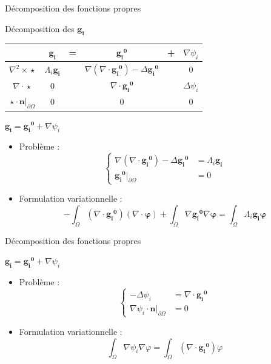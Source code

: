 \documentclass{beamer}
\newcommand{\grad}{{\nabla}}
\newcommand{\laplace}{{\Delta}}
\newcommand{\rott}{{\nabla^2\times}}
\renewcommand{\div}{{\nabla\cdot}}
\newcommand{\restr}{{\big\rvert_{\partial\Omega}}}
\begin{document}
\begin{frame}{Décomposition des fonctions propres}
\begin{block}{Décomposition des $\mathbf{g_i}$}
\begin{center}
\begin{tabular}{c|ccccc}
& $\mathbf{g_i}$ & = & $\mathbf{\mathbf{g_i}^0}$ & + & $\grad\psi_i$ \\ \hline
$\rott\star$ & $\Lambda_i \mathbf{g_i}$ & & $\grad(\div \mathbf{\mathbf{g_i}^0})-\laplace \mathbf{\mathbf{g_i}^0}$ & & 0\\ \hline
$\div\star$ & 0 & & $\div \mathbf{\mathbf{g_i}^0}$ & & $\laplace\psi_i$\\ \hline
$\star\cdot \mathbf{n}\restr$ & 0 & & 0 & & 0
\end{tabular}
\end{center}
\end{block}
\begin{block}{$\mathbf{g_i}=\mathbf{\mathbf{g_i}^0}+\grad\psi_i$}
\begin{itemize}
\item Problème :
\[\left\{\begin{aligned}
\grad(\div \mathbf{\mathbf{g_i}^0})-\laplace \mathbf{\mathbf{g_i}^0} &= \Lambda_i \mathbf{g_i}\\
\mathbf{\mathbf{g_i}^0}\restr &= 0
\end{aligned}\right.\]
\item Formulation variationnelle :
\[ -\int_\Omega (\div \mathbf{\mathbf{g_i}^0})(\div\bm{\varphi}) + \int_\Omega \grad \mathbf{\mathbf{g_i}^0}\grad\bm{\varphi} = \int_\Omega \Lambda_i\mathbf{g_i}\bm{\varphi} \]
\end{itemize}
\end{block}
\end{frame}

\begin{frame}{Décomposition des fonctions propres}
\begin{block}{$\mathbf{g_i}=\mathbf{\mathbf{g_i}^0}+\grad\psi_i$}
\begin{itemize}
\item Problème :
\[\left\{\begin{aligned}
-\laplace\psi_i &= \div \mathbf{\mathbf{g_i}^0}\\
\grad\psi_i\cdot \mathbf{n}\restr &= 0
\end{aligned}\right.\]
\item Formulation variationnelle :
\[ \int_\Omega \grad\psi_i\grad\varphi = \int_\Omega (\div \mathbf{\mathbf{g_i}^0})\varphi \]
\end{itemize}
\end{block}
\end{frame}
\end{document}
